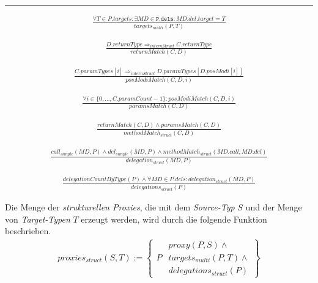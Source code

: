 \hrule

\begin{gather*}
\frac{\forall \mathit{T} \in \mathit{P.targets}:\exists \mathit{MD} \in \mathtt{P.dels}:\mathit{MD.del.target} = T}{\mathit{targets_{multi}(P, T)}}
\end{gather*}




\begin{gather*}
\frac{\mathit{D.returnType} \Rightarrow_{internStruct} \mathit{C.returnType}}{\mathit{returnMatch(C,D)}}
\end{gather*} 

\begin{gather*}
\frac{
\mathit{C.paramTypes}[i] \Rightarrow_{internStruct} \mathit{D.paramTypes}[\mathit{D.posModi}[i]]}{\mathit{posModiMatch(C,D,i)}}
\end{gather*} 

\begin{gather*}
\frac{\forall \mathit{i} \in \{0,...,\mathit{C.paramCount}-1\}: \mathit{posModiMatch(C,D,i)}
}{\mathit{paramsMatch(C,D)}}
\end{gather*} 

\begin{gather*}
\frac{\mathit{returnMatch(C,D) \wedge \mathit{paramsMatch(C,D)}}}
{\mathit{methodMatch_{struct}(C,D)}}
\end{gather*}

\begin{gather*}
\frac{\mathit{call_{simple}(MD, P)} \wedge \mathit{del_{simple}(MD, P)} \wedge \mathit{methodMatch_{struct}(MD.call, MD.del)}}
{\mathit{delegation_{struct}(MD, P)}}
\end{gather*}

\begin{gather*}
\frac{\mathit{delegationCountByType(P)} \wedge \forall \mathit{MD} \in P.dels: \mathit{delegation_{struct}(MD,P)}}
{\mathit{delegations_{struct}(P)}}
\end{gather*}


Die Menge der \emph{strukturellen Proxies}, die mit dem \emph{Source-Typ} $S$ und der Menge von \emph{Target-Typen} $T$ erzeugt werden, wird durch die folgende Funktion beschrieben.
\begin{gather*}
\mathit{proxies_{struct}(S,T)} := 
\left\{\begin{array}{l|l}
		& \mathit{proxy(P,S)}\wedge \mathit{ }\\
	P	& \mathit{targets_{multi}(P,T)} \wedge \mathit{ }\\
		& \mathit{delegations_{struct}(P)}  
		 \end{array}
\right\}
\end{gather*}

